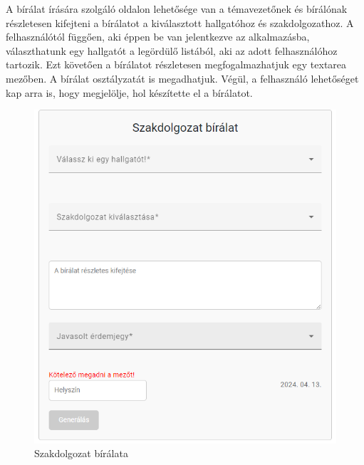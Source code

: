 A bírálat írására szolgáló oldalon lehetősége van a témavezetőnek és bírálónak részletesen kifejteni a bírálatot a kiválasztott hallgatóhoz és szakdolgozathoz. A felhasználótól függően, aki éppen be van jelentkezve az alkalmazásba, választhatunk egy hallgatót a legördülő listából, aki az adott felhasználóhoz tartozik. Ezt követően a bírálatot részletesen megfogalmazhatjuk egy textarea mezőben. A bírálat osztályzatát is megadhatjuk. Végül, a felhasználó lehetőséget kap arra is, hogy megjelölje, hol készítette el a bírálatot.


\begin{figure}[h!]
\centering
\includegraphics[scale=0.5]{images/Review.png}
\caption{Szakdolgozat bírálata}
\label{fig:Review}
\end{figure}

\newpage


